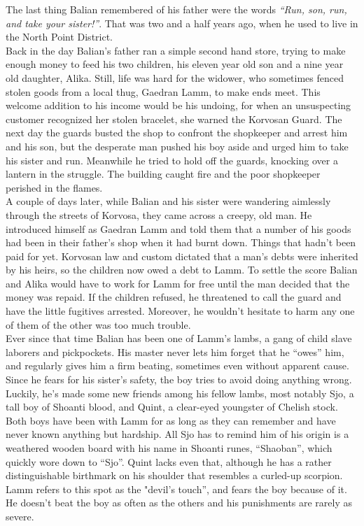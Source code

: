 The last thing Balian remembered of his father were the words {\itshape ``Run, son, run, and take your sister!''}. That was two and a half years ago, when he used to live in the North Point District.\\

Back in the day Balian's father ran a simple second hand store, trying to make enough money to feed his two children, his eleven year old son and a nine year old daughter, Alika. Still, life was hard for the widower, who sometimes fenced stolen goods from a local thug, Gaedran Lamm, to make ends meet. This welcome addition to his income would be his undoing, for when an unsuspecting customer recognized her stolen bracelet, she warned the Korvosan Guard. The next day the guards busted the shop to confront the shopkeeper and arrest him and his son, but the desperate man pushed his boy aside and urged him to take his sister and run. Meanwhile he tried to hold off the guards, knocking over a lantern in the struggle. The building caught fire and the poor shopkeeper perished in the flames.\\

A couple of days later, while Balian and his sister were wandering aimlessly through the streets of Korvosa, they came across a creepy, old man. He introduced himself as Gaedran Lamm and told them that a number of his goods had been in their father's shop when it had burnt down. Things that hadn't been paid for yet. Korvosan law and custom dictated that a man's debts were inherited by his heirs, so the children now owed a debt to Lamm. To settle the score Balian and Alika would have to work for Lamm for free until the man decided that the money was repaid. If the children refused, he threatened to call the guard and have the little fugitives arrested. Moreover, he wouldn't hesitate to harm any one of them of the other was too much trouble.\\

Ever since that time Balian has been one of Lamm's lambs, a gang of child slave laborers and pickpockets. His master never lets him forget that he ``owes'' him, and regularly gives him a firm beating, sometimes even without apparent cause. Since he fears for his sister's safety, the boy tries to avoid doing anything wrong.\\

Luckily, he's made some new friends among his fellow lambs, most notably Sjo, a tall boy of Shoanti blood, and Quint, a clear-eyed youngster of Chelish stock. Both boys have been with Lamm for as long as they can remember and have never known anything but hardship. All Sjo has to remind him of his origin is a weathered wooden board with his name in Shoanti runes, ``Shaoban'', which quickly wore down to ``Sjo''. Quint lacks even that, although he has a rather distinguishable birthmark on his shoulder that resembles a curled-up scorpion. Lamm refers to this spot as the "devil's touch'', and fears the boy because of it. He doesn't beat the boy as often as the others and his punishments are rarely as severe.\\


